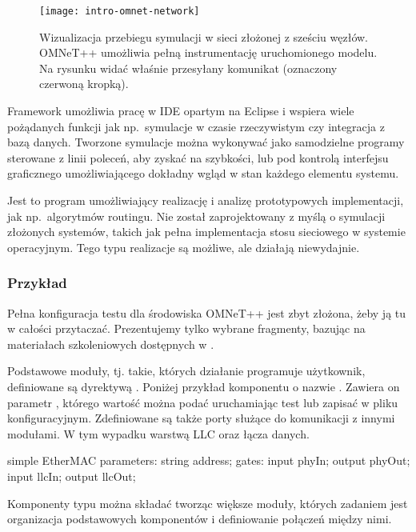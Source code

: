 \documentclass[00-praca-magisterska.tex]{subfiles}
\begin{document}
\begin{figure}
\begin{center}
\leavevmode
\texttt{[image: intro-omnet-network]}
\end{center}
\caption{Wizualizacja przebiegu symulacji w sieci złożonej z sześciu węzłów.
OMNeT++ umożliwia pełną instrumentację uruchomionego modelu. Na rysunku widać
właśnie przesyłany komunikat (oznaczony czerwoną kropką).}
\label{fig:intro-omnet-network}
\end{figure}

Framework umożliwia pracę w IDE opartym na Eclipse i wspiera wiele pożądanych
funkcji jak np.~symulacje w czasie rzeczywistym czy integracja z bazą danych.
Tworzone symulacje można wykonywać jako samodzielne programy sterowane z linii
poleceń, aby zyskać na szybkości, lub pod kontrolą interfejsu graficznego
umożliwiającego dokładny wgląd w stan każdego elementu systemu.

Jest to program umożliwiający realizację i analizę prototypowych implementacji,
jak np.~algorytmów routingu. Nie został zaprojektowany z myślą o symulacji
złożonych systemów, takich jak pełna implementacja stosu sieciowego w systemie
operacyjnym. Tego typu realizacje są możliwe, ale działają niewydajnie.

\subsubsection{Przykład}

Pełna konfiguracja testu dla środowiska OMNeT++ jest zbyt złożona, żeby ją tu w
całości przytaczać. Prezentujemy tylko wybrane fragmenty, bazując na
materiałach szkoleniowych dostępnych w \cite{omnet-doc}.

Podstawowe moduły, tj. takie, których działanie programuje użytkownik,
definiowane są dyrektywą . Poniżej przykład komponentu o nazwie
. Zawiera on parametr , którego wartość można
podać uruchamiając test lub zapisać w pliku konfiguracyjnym. Zdefiniowane są
także porty służące do komunikacji z innymi modułami. W tym wypadku warstwą LLC
oraz łącza danych.

\begin{textcode}
  simple EtherMAC {
      parameters:
          string address;
      gates:
          input phyIn;
          output phyOut;
          input llcIn;
          output llcOut;
  }
\end{textcode}

Komponenty typu  można składać tworząc większe moduły, których
zadaniem jest organizacja podstawowych komponentów i definiowanie połączeń
między nimi.
\end{document}
